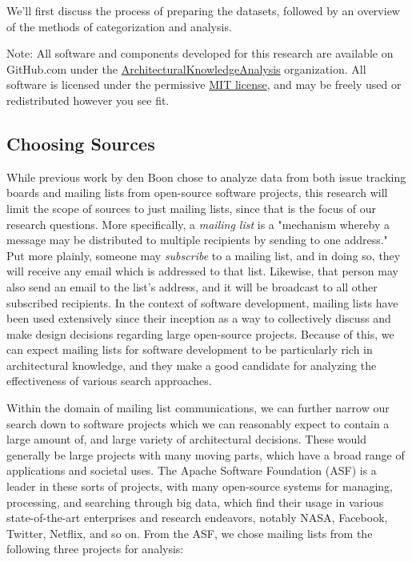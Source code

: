 \documentclass[a4paper, 12pt]{article}
\begin{document}
	We'll first discuss the process of preparing the datasets, followed by an overview of the methods of categorization and analysis.
	
	\footnotesize
	Note: All software and components developed for this research are available on GitHub.com under the \href{https://github.com/ArchitecturalKnowledgeAnalysis}{ArchitecturalKnowledgeAnalysis} organization. All software is licensed under the permissive \href{https://en.wikipedia.org/wiki/MIT_License}{MIT license}, and may be freely used or redistributed however you see fit.
	\normalsize
	
	\subsection{Choosing Sources}
		While previous work by den Boon chose to analyze data from both issue tracking boards and mailing lists from open-source software projects\autocite{denboon}, this research will limit the scope of sources to just mailing lists, since that is the focus of our research questions. More specifically, a \textit{mailing list} is a "mechanism whereby a message may be distributed to multiple recipients by sending to one address."\autocite{mailinglistrfc} Put more plainly, someone may \textit{subscribe} to a mailing list, and in doing so, they will receive any email which is addressed to that list. Likewise, that person may also send an email to the list's address, and it will be broadcast to all other subscribed recipients. In the context of software development, mailing lists have been used extensively since their inception as a way to collectively discuss and make design decisions regarding large open-source projects. Because of this, we can expect mailing lists for software development to be particularly rich in architectural knowledge, and they make a good candidate for analyzing the effectiveness of various search approaches.
		
		Within the domain of mailing list communications, we can further narrow our search down to software projects which we can reasonably expect to contain a large amount of, and large variety of architectural decisions. These would generally be large projects with many moving parts, which have a broad range of applications and societal uses. The Apache Software Foundation (ASF) is a leader in these sorts of projects, with many open-source systems for managing, processing, and searching through big data, which find their usage in various state-of-the-art enterprises and research endeavors, notably NASA, Facebook, Twitter, Netflix, and so on\autocite{akhtar}. From the ASF, we chose mailing lists from the following three projects for analysis:
		
\end{document}
